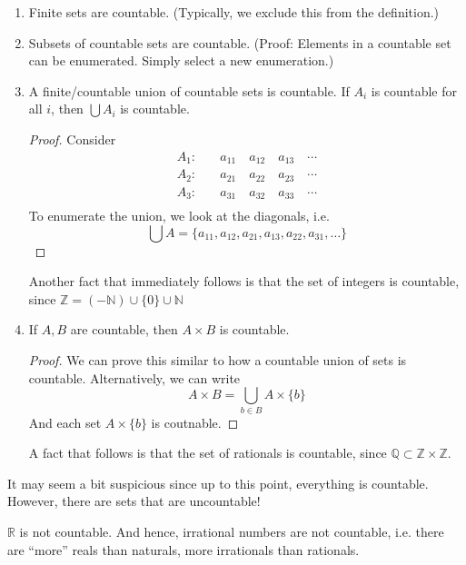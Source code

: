 \documentclass{article}
\numberwithin{equation}{section}
\begin{document}
\begin{enumerate}
    \item Finite sets are countable. (Typically, we exclude this from the definition.)
    \item Subsets of countable sets are countable. (Proof: Elements in a countable set can be enumerated. Simply select a new enumeration.)
    \item A finite/countable union of countable sets is countable. If $A_i$ is countable for all $i$, then $\bigcup A_i$ is countable.
          \begin{proof}
              Consider
              \begin{align*}
                  A_1: & \quad a_{11}\quad a_{12}\quad a_{13}\quad \cdots \\
                  A_2: & \quad a_{21}\quad a_{22}\quad a_{23}\quad \cdots \\
                  A_3: & \quad a_{31}\quad a_{32}\quad a_{33}\quad \cdots \\
              \end{align*}
              To enumerate the union, we look at the diagonals, i.e.
              \begin{equation}
                  \bigcup A = \{a_{11}, a_{12}, a_{21}, a_{13}, a_{22}, a_{31}, \dots \}
              \end{equation}
          \end{proof}
          Another fact that immediately follows is that the set of integers is countable, since $\mathbb{Z} = (-\mathbb{N})\cup \{0\} \cup \mathbb{N}$
    \item If $A,B$ are countable, then $A\times B$ is countable.
          \begin{proof}
              We can prove this similar to how a countable union of sets is countable. Alternatively, we can write
              \begin{equation}
                  A\times B = \bigcup_{b\in B} A \times \{b\}
              \end{equation}
              And each set $A\times \{b\}$ is coutnable.
          \end{proof}
          A fact that follows is that the set of rationals is countable, since $\mathbb{Q} \subset \mathbb{Z}\times \mathbb{Z}.$
\end{enumerate}
It may seem a bit suspicious since up to this point, everything is countable. However, there are sets that are uncountable!
\begin{theorem}
    $\mathbb{R}$ is not countable. And hence, irrational numbers are not countable, i.e. there are ``more'' reals than naturals, more irrationals than rationals.
\end{theorem}
\end{document}

